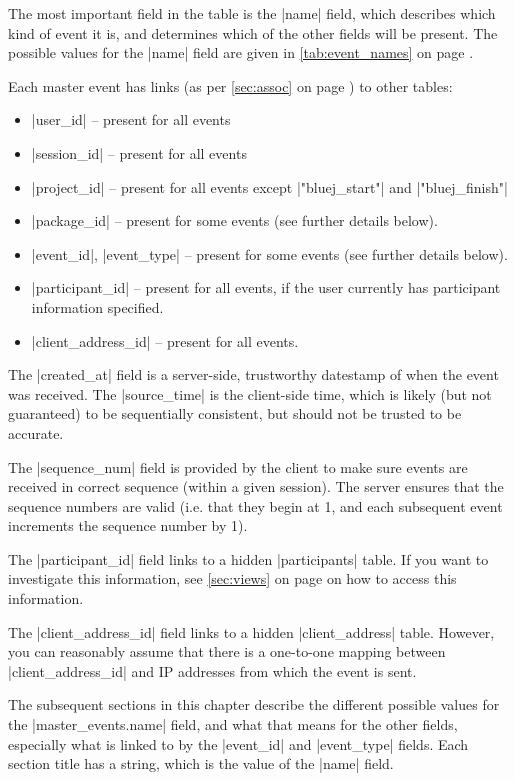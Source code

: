 \documentclass{report}
\newcommand{\myref}[1]{\autoref{#1} on page \pageref*{#1}}
\begin{document}

The most important field in the table is the |name| field, which describes
which kind of event it is, and determines which of the other fields will be
present.  The possible values for the |name| field are given in \myref{tab:event_names}.

Each master event has links (as per \myref{sec:assoc}) to other tables:
\begin{itemize}
\item |user_id| -- present for all events
\item |session_id| -- present for all events
\item |project_id| -- present for all events except |"bluej_start"| and |"bluej_finish"|
\item |package_id| -- present for some events (see further details below).
\item |event_id|, |event_type| -- present for some events (see further details below).
\item |participant_id| -- present for all events, if the user currently has
  participant information specified.
\item |client_address_id| -- present for all events.
\end{itemize}

The |created_at| field is a server-side, trustworthy datestamp of when
the event was received.  The |source_time| is the client-side time,
which is likely (but not guaranteed) to be sequentially consistent, but should
not be trusted to be accurate.

The |sequence_num| field is provided by the client to make sure events are
received in correct sequence (within a given session).  The server ensures
that the sequence numbers are valid (i.e. that they begin at 1, and each
subsequent event increments the sequence number by 1).


The |participant_id| field links to a hidden |participants| table.  If you
want to investigate this information, see \myref{sec:views} on how to
access this information.


The |client_address_id| field links to a hidden |client_address| table.
However, you can reasonably assume that there is a one-to-one mapping between
|client_address_id| and IP addresses from which the event is sent.


The subsequent sections in this chapter describe the different possible values for the
|master_events.name| field, and what that means for the other fields,
especially what is linked to by the |event_id| and |event_type| fields.  Each
section title has a string, which is the value of the |name| field.
\end{document}
